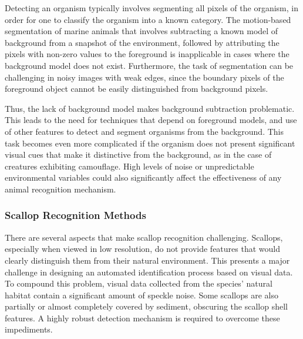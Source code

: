 \documentclass {udthesis}
\begin{document}
Detecting an organism typically involves segmenting all pixels of the organism, in order for one to classify the organism into a known category. 
The motion-based segmentation of marine animals that involves subtracting a known model of background from a snapshot of the environment, followed by attributing the pixels with non-zero values to the foreground is inapplicable in cases where the background model does not exist. 
Furthermore, the task of segmentation can be challenging in noisy images with weak edges, since the boundary pixels of the foreground object cannot be easily distinguished from background pixels.

Thus, the lack of background model makes background subtraction problematic. This leads to the need for techniques that depend on foreground models, and use of other features to detect and segment organisms from the background. This task becomes even more complicated if the organism does not present significant visual cues that make it distinctive from the background, as in the case of creatures exhibiting camouflage. High levels of noise or unpredictable environmental variables could also significantly affect the effectiveness of any animal recognition mechanism.


\subsubsection{Scallop Recognition Methods}


There are several aspects that make scallop recognition challenging.
Scallops, especially when viewed in low resolution, do not provide features
that would clearly distinguish them from their natural environment.  This
presents a major challenge in designing an automated identification process 
based on visual data.  To compound this problem, visual data collected
from the species' natural habitat contain a
significant amount of speckle noise.
Some scallops are also partially or almost completely
covered by sediment, obscuring the scallop shell features.
A highly robust detection mechanism is required to overcome these impediments.
\end{document}
